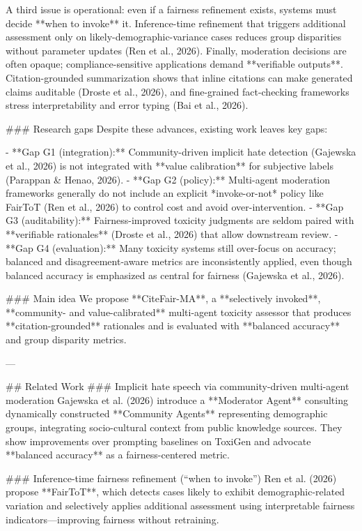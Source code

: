 A third issue is operational: even if a fairness refinement exists, systems must decide **when to invoke** it. Inference-time refinement that triggers additional assessment only on likely-demographic-variance cases reduces group disparities without parameter updates (Ren et al., 2026). Finally, moderation decisions are often opaque; compliance-sensitive applications demand **verifiable outputs**. Citation-grounded summarization shows that inline citations can make generated claims auditable (Droste et al., 2026), and fine-grained fact-checking frameworks stress interpretability and error typing (Bai et al., 2026).

### Research gaps  
Despite these advances, existing work leaves key gaps:

- **Gap G1 (integration):** Community-driven implicit hate detection (Gajewska et al., 2026) is not integrated with **value calibration** for subjective labels (Parappan & Henao, 2026).  
- **Gap G2 (policy):** Multi-agent moderation frameworks generally do not include an explicit *invoke-or-not* policy like FairToT (Ren et al., 2026) to control cost and avoid over-intervention.  
- **Gap G3 (auditability):** Fairness-improved toxicity judgments are seldom paired with **verifiable rationales** (Droste et al., 2026) that allow downstream review.  
- **Gap G4 (evaluation):** Many toxicity systems still over-focus on accuracy; balanced and disagreement-aware metrics are inconsistently applied, even though balanced accuracy is emphasized as central for fairness (Gajewska et al., 2026).

### Main idea  
We propose **CiteFair-MA**, a **selectively invoked**, **community- and value-calibrated** multi-agent toxicity assessor that produces **citation-grounded** rationales and is evaluated with **balanced accuracy** and group disparity metrics.

---

## Related Work  
### Implicit hate speech via community-driven multi-agent moderation  
Gajewska et al. (2026) introduce a **Moderator Agent** consulting dynamically constructed **Community Agents** representing demographic groups, integrating socio-cultural context from public knowledge sources. They show improvements over prompting baselines on ToxiGen and advocate **balanced accuracy** as a fairness-centered metric.

### Inference-time fairness refinement (“when to invoke”)  
Ren et al. (2026) propose **FairToT**, which detects cases likely to exhibit demographic-related variation and selectively applies additional assessment using interpretable fairness indicators—improving fairness without retraining.

